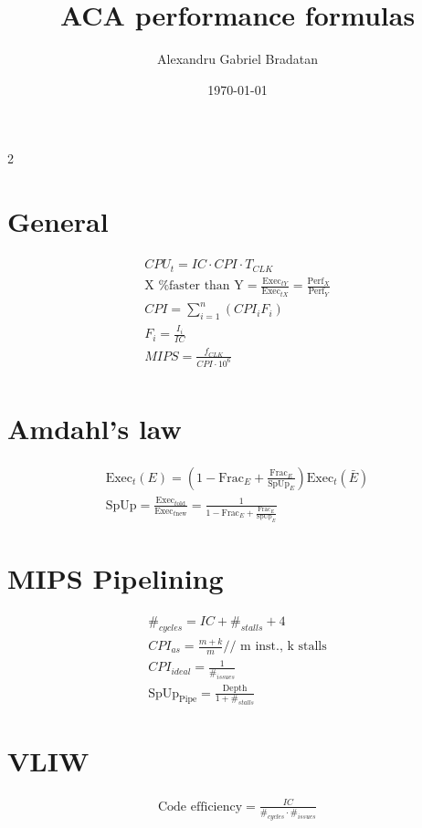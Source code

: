 \documentclass[a4paper,12pt]{article}
\title{ACA performance formulas}
\author{Alexandru Gabriel Bradatan}
\date{\today}
\begin{document}
\thispagestyle{empty}
\begin{multicols*}{2}
  \section{General}
  {\large\begin{gather*}
    \mathit{CPU}_t = \mathit{IC}\cdot\mathit{CPI}\cdot T_{\mathit{CLK}} \\
    \text{X \% faster than Y} = \frac{\text{Exec}_{tY}}{\text{Exec}_{tX}}
                              = \frac{\text{Perf}_X}{\text{Perf}_Y}\\
    \mathit{CPI}   = \sum_{i=1}^n (\mathit{CPI}_i F_i) \\
    F_i            = \frac{I_i}{\mathit{IC}} \\
    \mathit{MIPS}  = \frac{f_{\mathit{CLK}}}{\mathit{CPI}\cdot 10^6} \\
  \end{gather*}}

  \section{Amdahl's law}
  {\large\begin{gather*}
    \text{Exec}_t(E) = (1-\text{Frac}_E + \frac{\text{Frac}_E}{\text{SpUp}_E})\text{Exec}_t(\bar{E}) \\
    \text{SpUp} = \frac{\text{Exec}_{t\text{old}}}{\text{Exec}_{t\text{new}}}
                = \frac{1}{1-\text{Frac}_E + \frac{\text{Frac}_E}{\text{SpUp}_E}}
  \end{gather*}}

  \section{MIPS Pipelining}
  {\large\begin{gather*}
    \#_\mathit{cycles} = \mathit{IC} + \#_\mathit{stalls} + 4 \\
    CPI_{as} = \frac{m + k}{m} \text{// m inst., k stalls} \\
    CPI_{ideal} = \frac{1}{\#_{\mathit{issues}}} \\
    \text{SpUp}_\text{Pipe} = \frac{\text{Depth}}{1+\#_\mathit{stalls}}
  \end{gather*}}

  \section{VLIW}
  {\large\begin{gather*}
    \text{Code efficiency} = \frac{\mathit{IC}}{\#_\mathit{cycles}\cdot\#_\mathit{issues}} \\
  \end{gather*}}


\end{multicols*}
\end{document}
